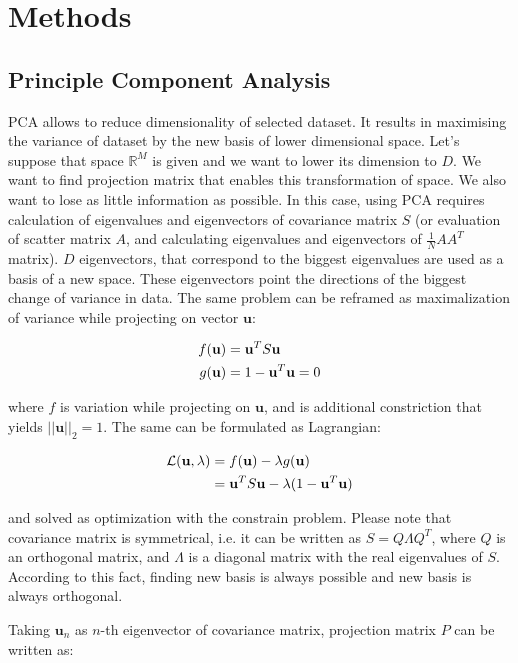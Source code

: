 \documentclass[a4paper, 10 pt, conference]{ieeeconf}
\newcommand{\bb}{\textbf}
\begin{document}
\section{Methods}

\subsection{Principle Component Analysis}
PCA allows to reduce dimensionality of selected dataset. It results in maximising the variance of dataset by the new basis of lower dimensional space. Let's suppose that space $\mathbb{R}^{M}$ is given and we want to lower its dimension to $D$. We want to find projection matrix that enables this transformation of space. We also want to lose as little information as possible. In this case, using PCA requires calculation of eigenvalues and eigenvectors of covariance matrix $S$ (or evaluation of scatter matrix $A$, and calculating eigenvalues and eigenvectors of $\frac{1}{N}AA^{T}$ matrix). $D$ eigenvectors, that correspond to the biggest eigenvalues are used as a basis of a new space. These eigenvectors point the directions of the biggest change of variance in data.  The same problem can be reframed as maximalization of variance while projecting on vector $\bb{u}$:

\begin{align}
	f(\bb{u}) &= \bb{u}^T S \bb{u} \\
	g(\bb{u}) &= 1 - \bb{u}^T \bb{u} = 0   \notag
\end{align}

where $f$ is variation while projecting on $\bb{u}$, and is additional constriction that yields $||\bb{u}||_{2} = 1$. The same can be formulated as Lagrangian:

\begin{align}
	\mathcal{L}(\bb{u}, \lambda) &= f(\bb{u}) - \lambda g(\bb{u}) \\
	    &= \bb{u}^T S \bb{u} - \lambda (1 - \bb{u}^T \bb{u})   \notag
\end{align}

and solved as optimization with the constrain problem. Please note that covariance matrix is symmetrical, i.e. it can be written as $S = Q \Lambda Q^{T}$, where $Q$ is an orthogonal matrix, and $\Lambda$ is a diagonal matrix with the real eigenvalues of $S$. According to this fact, finding new basis is always possible and new basis is always orthogonal.

Taking $\bb{u}_{n}$ as $n$-th eigenvector of covariance matrix, projection matrix $P$ can be written as:
\end{document}
